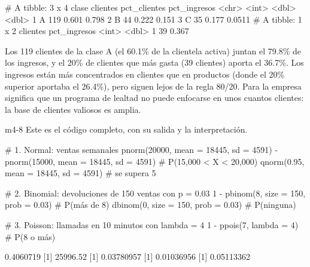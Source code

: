 \begin{rsalida}
# A tibble: 3 x 4
  clase clientes pct_clientes pct_ingresos
  <chr>    <int>        <dbl>        <dbl>
1 A          119        0.601       0.798
2 B           44        0.222       0.151
3 C           35        0.177       0.0511
# A tibble: 1 x 2
  clientes pct_ingresos
     <int>        <dbl>
1       39        0.367
\end{rsalida}

Los 119 clientes de la clase A (el 60.1\% de la clientela activa) juntan el
79.8\% de los ingresos, y el 20\% de clientes que más gasta (39 clientes)
aporta el 36.7\%.
Los ingresos están más concentrados en clientes que en productos (donde el
20\% superior aportaba el 26.4\%), pero siguen lejos de la regla 80/20.
Para la empresa significa que un programa de lealtad no puede enfocarse en
unos cuantos clientes: la base de clientes valiosos es amplia.


\begin{solucion}{m4-8}
Este es el código completo, con su salida y la interpretación.
\end{solucion}

\begin{rcode}
# 1. Normal: ventas semanales
pnorm(20000, mean = 18445, sd = 4591) -
  pnorm(15000, mean = 18445, sd = 4591)       # P(15,000 < X < 20,000)
qnorm(0.95, mean = 18445, sd = 4591)          # se supera 5%

# 2. Binomial: devoluciones de 150 ventas con p = 0.03
1 - pbinom(8, size = 150, prob = 0.03)        # P(más de 8)
dbinom(0, size = 150, prob = 0.03)            # P(ninguna)

# 3. Poisson: llamadas en 10 minutos con lambda = 4
1 - ppois(7, lambda = 4)                      # P(8 o más)
\end{rcode}
\begin{rsalida}
[1] 0.4060719
[1] 25996.52
[1] 0.03780957
[1] 0.01036956
[1] 0.05113362
\end{rsalida}


